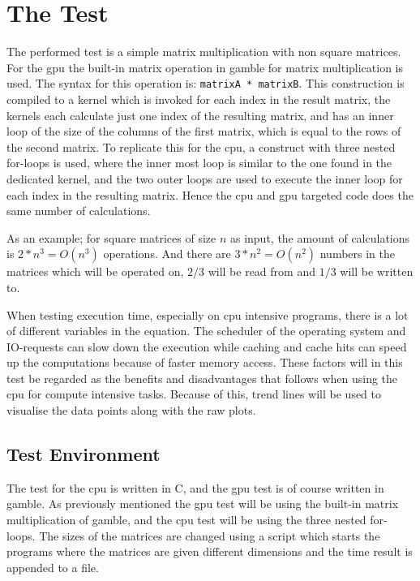 \section{The Test} %
\label{sec:the_test}
The performed test is a simple matrix multiplication with non square matrices.
For the \acrshort{gpu} the built-in matrix operation in \gls{gamble} for matrix multiplication is used. 
The syntax for this operation is: \texttt{matrixA * matrixB}. 
This construction is compiled to a kernel which is invoked for each index in the result matrix, the kernels each calculate just one index of the resulting matrix, and has an inner loop of the size of the columns of the first matrix, which is equal to the rows of the second matrix.
To replicate this for the \acrshort{cpu}, a construct with three nested for-loops is used, where the inner most loop is similar to the one found in the dedicated kernel, and the two outer loops are used to execute the inner loop for each index in the resulting matrix.
Hence the \acrshort{cpu} and \acrshort{gpu} targeted code does the same number of calculations.
 
As an example; for square matrices of size $n$ as input, the amount of calculations is $2*n^3 = O(n^3)$ operations. 
And there are $3*n^2 = O(n^2)$ numbers in the matrices which will be operated on, $2/3$ will be read from and $1/3$ will be written to.

When testing execution time, especially on \acrshort{cpu} intensive programs, there is a lot of different variables in the equation. 
The scheduler of the operating system and IO-requests can slow down the execution while caching and cache hits can speed up the computations because of faster memory access. 
These factors will in this test be regarded as the benefits and disadvantages that follows when using the \acrshort{cpu} for compute intensive tasks.
Because of this, trend lines will be used to visualise the data points along with the raw plots.

\subsection{Test Environment} %
\label{sub:test_environment}
The test for the \acrshort{cpu} is written in C, and the \acrshort{gpu} test is of course written in \gls{gamble}.
As previously mentioned the \acrshort{gpu} test will be using the built-in matrix multiplication of \gls{gamble}, and the \acrshort{cpu} test will be using the three nested for-loops.
The sizes of the matrices are changed using a script which starts the programs where the matrices are given different dimensions and the time result is appended to a file.

